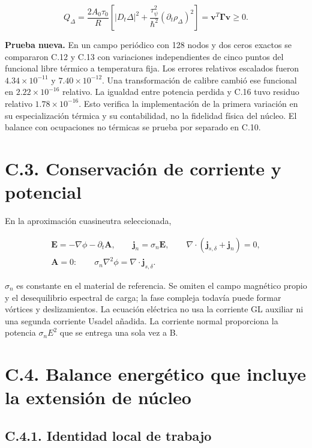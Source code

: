 \documentclass[
  spanish,
  10pt,
  a4paper,
]{article}
\begin{document}
\[
Q_\Delta=\frac{2A_0\tau_0}{R}
\left[|D_t\Delta|^2+\frac{\tau_\psi^2}{\hbar^2}(\partial_t\rho_\Delta)^2\right]
=\mathbf v^T\boldsymbol\Gamma\mathbf v\geq0.
\tag{C.16}
\]

\textbf{Prueba nueva.} En un campo periódico con 128 nodos y dos ceros
exactos se compararon C.12 y C.13 con variaciones independientes de
cinco puntos del funcional libre térmico a temperatura fija. Los errores
relativos escalados fueron \(4.34\times10^{-11}\) y
\(7.40\times10^{-12}\). Una transformación de calibre cambió ese
funcional en \(2.22\times10^{-16}\) relativo. La igualdad entre potencia
perdida y C.16 tuvo residuo relativo \(1.78\times10^{-16}\). Esto
verifica la implementación de la primera variación en su especialización
térmica y su contabilidad, no la fidelidad física del núcleo. El balance
con ocupaciones no térmicas se prueba por separado en C.10.

\section{C.3. Conservación de corriente y
potencial}\label{c.3.-conservaciuxf3n-de-corriente-y-potencial}

En la aproximación cuasineutra seleccionada,

\[
\begin{gathered}
\mathbf E=-\nabla\phi-\partial_t\mathbf A,\qquad
\mathbf j_n=\sigma_n\mathbf E,\qquad
\nabla\cdot(\mathbf j_{s,\delta}+\mathbf j_n)=0,\\
\mathbf A=0:\qquad \sigma_n\nabla^2\phi=\nabla\cdot\mathbf j_{s,\delta}.
\end{gathered}\tag{C.17}
\]

\(\sigma_n\) es constante en el material de referencia. Se omiten el
campo magnético propio y el desequilibrio espectral de carga; la fase
compleja todavía puede formar vórtices y deslizamientos. La ecuación
eléctrica no usa la corriente GL auxiliar ni una segunda corriente
Usadel añadida. La corriente normal proporciona la potencia
\(\sigma_nE^2\) que se entrega una sola vez a B.

\section{C.4. Balance energético que incluye la extensión de
núcleo}\label{c.4.-balance-energuxe9tico-que-incluye-la-extensiuxf3n-de-nuxfacleo}

\subsection{C.4.1. Identidad local de
trabajo}\label{c.4.1.-identidad-local-de-trabajo}
\end{document}
